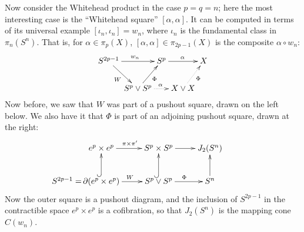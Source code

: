 \documentclass{article}
\begin{document}
Now consider the Whitehead product in the case $p = q = n$; here the most interesting case is the ``Whitehead square'' $[\alpha, \alpha]$.  It can be computed in terms of its universal example $[\iota_n, \iota_n] = w_n$, where $\iota_n$ is the fundamental class in $\pi_n (S^n)$. That is, for $\alpha\in\pi_p(X)$, $[\alpha,\alpha]\in\pi_{2p-1}(X)$ is the composite $\alpha \circ w_n$:
\[\xymatrix@R=.7cm@C=0cm
{S^{2p-1}\ar[rr]^{w_n}\ar[dr]_{W}&&S^p\ar[rr]^\alpha&&X\\
&S^p\vee S^p\ar[ur]_{\Phi}\ar@{..>}[rr]^\alpha&&X\vee X\ar@{..>}[ur]_{\Phi}
}\]
Now before, we saw that $W$ was part of a pushout square, drawn on the left below. We also have it that $\Phi$ is part of an adjoining pushout square, drawn at the right:
\[\xymatrix{
e^p\times e^p\ar[r]^{\pi\times\pi'}&S^p\times S^p\ar[r]&J_2(S^n)\\
\makebox[0cm][r]{$S^{2p-1}=$\,}
\partial(e^p\times e^p)\ar@{^{(}->}[u]\ar[r]^W&S^p\vee S^p\ar@{^{(}->}[u]\ar[r]^\Phi &S^n\ar[u]
}\]
Now the outer square is a pushout diagram, and the inclusion of $S^{2p-1}$ in the contractible space $e^p\times e^p$ is a cofibration, so that $J_2(S^n)$ is the mapping cone $C(w_n)$.
\end{document}
